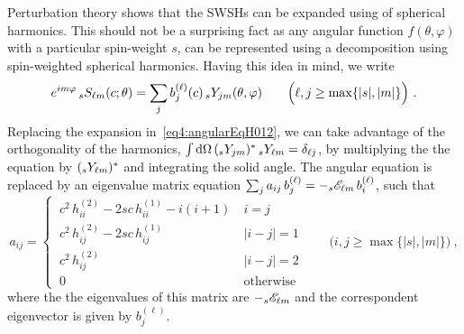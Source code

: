 Perturbation theory shows that the SWSHs can be expanded using of spherical harmonics.
This should not be a surprising fact as any angular function $f(\theta,\varphi)$ with a particular spin-weight $s$, can be represented using a decomposition using spin-weighted spherical harmonics.
Having this idea in mind, we write 
\begin{align}
	e^{i m \varphi} \, \uu[s]{S}{\ell m}(c; \theta) = \sum_{j} b_{j}^{(\ell)}(c) \,\uu[s]{Y}{j m}(\theta,\varphi) \qquad \Big( \ell, j \ge \max\{|s|,|m|\} \Big) ~.
\end{align}
Replacing the expansion in~\eqref{eq4:angularEqH012}, we can take advantage of the orthogonality of the harmonics, $\int \dd\Omega \,(\uu[s]{Y}{j m})^* \,\uu[s]{Y}{\ell m} = \delta_{\ell j}$, by multiplying the the equation by $(\uu[s]{Y}{\ell m})^*$ and integrating the solid angle.
The angular equation is replaced by an eigenvalue matrix equation $\sum_{j} a_{ij} \, b_{j}^{(\ell)} = - \uu[s]{\mathscr{E}}{\ell m} \,b_{i}^{(\ell)}$, such that
\begin{equation}
	\label{eq4:spectralMatrix}
	a_{ij} =
	\begin{cases} 
		~c^2 \,h^{(2)}_{ii} - 2 s c \,h^{(1)}_{ii} - i(i+1) & ~ i=j \\[-0.5ex]
		~c^2 \,h^{(2)}_{ij} - 2 s c \,h^{(1)}_{ij} & ~ |i-j|=1 \\[-0.5ex]
		~c^2 \,h^{(2)}_{ij} & ~ |i-j|=2 \\[-0.5ex]
		~0 & ~\text{otherwise}
	\end{cases}  \qquad \Big( i, j \ge \max\{|s|,|m|\} \Big) ~,
\end{equation}
where the the eigenvalues of this matrix are $-\uu[s]{\mathscr{E}}{\ell m}$ and the correspondent eigenvector is given by $b_j^{(\ell)}$.


